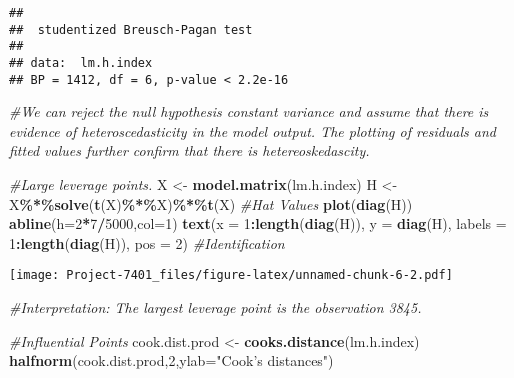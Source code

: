 \documentclass[
]{article}
\newenvironment{Shaded}{\begin{snugshade}}{\end{snugshade}}
\newcommand{\AttributeTok}[1]{\textcolor[rgb]{0.13,0.29,0.53}{#1}}
\newcommand{\CommentTok}[1]{\textcolor[rgb]{0.56,0.35,0.01}{\textit{#1}}}
\newcommand{\DecValTok}[1]{\textcolor[rgb]{0.00,0.00,0.81}{#1}}
\newcommand{\FunctionTok}[1]{\textcolor[rgb]{0.13,0.29,0.53}{\textbf{#1}}}
\newcommand{\NormalTok}[1]{#1}
\newcommand{\OtherTok}[1]{\textcolor[rgb]{0.56,0.35,0.01}{#1}}
\newcommand{\SpecialCharTok}[1]{\textcolor[rgb]{0.81,0.36,0.00}{\textbf{#1}}}
\newcommand{\StringTok}[1]{\textcolor[rgb]{0.31,0.60,0.02}{#1}}
\begin{document}
\begin{verbatim}
## 
##  studentized Breusch-Pagan test
## 
## data:  lm.h.index
## BP = 1412, df = 6, p-value < 2.2e-16
\end{verbatim}

\begin{Shaded}
\begin{Highlighting}[]
\CommentTok{\#We can reject the null hypothesis constant variance and assume that there is evidence of heteroscedasticity in the model output. The plotting of residuals and fitted values further confirm that there is hetereoskedascity. }

\CommentTok{\#Large leverage points.}
\NormalTok{X }\OtherTok{\textless{}{-}} \FunctionTok{model.matrix}\NormalTok{(lm.h.index)}
\NormalTok{H }\OtherTok{\textless{}{-}}\NormalTok{ X}\SpecialCharTok{\%*\%}\FunctionTok{solve}\NormalTok{(}\FunctionTok{t}\NormalTok{(X)}\SpecialCharTok{\%*\%}\NormalTok{X)}\SpecialCharTok{\%*\%}\FunctionTok{t}\NormalTok{(X) }\CommentTok{\#Hat Values}
\FunctionTok{plot}\NormalTok{(}\FunctionTok{diag}\NormalTok{(H))}
\FunctionTok{abline}\NormalTok{(}\AttributeTok{h=}\DecValTok{2}\SpecialCharTok{*}\DecValTok{7}\SpecialCharTok{/}\DecValTok{5000}\NormalTok{,}\AttributeTok{col=}\DecValTok{1}\NormalTok{)}
\FunctionTok{text}\NormalTok{(}\AttributeTok{x =} \DecValTok{1}\SpecialCharTok{:}\FunctionTok{length}\NormalTok{(}\FunctionTok{diag}\NormalTok{(H)), }\AttributeTok{y =} \FunctionTok{diag}\NormalTok{(H), }\AttributeTok{labels =} \DecValTok{1}\SpecialCharTok{:}\FunctionTok{length}\NormalTok{(}\FunctionTok{diag}\NormalTok{(H)), }\AttributeTok{pos =} \DecValTok{2}\NormalTok{) }\CommentTok{\#Identification}
\end{Highlighting}
\end{Shaded}

\texttt{[image: Project-7401\_files/figure-latex/unnamed-chunk-6-2.pdf]}

\begin{Shaded}
\begin{Highlighting}[]
\CommentTok{\#Interpretation: The largest leverage point is the observation 3845.}

\CommentTok{\#Influential Points}
\NormalTok{cook.dist.prod }\OtherTok{\textless{}{-}} \FunctionTok{cooks.distance}\NormalTok{(lm.h.index)}
\FunctionTok{halfnorm}\NormalTok{(cook.dist.prod,}\DecValTok{2}\NormalTok{,}\AttributeTok{ylab=}\StringTok{"Cook’s distances"}\NormalTok{)}
\end{Highlighting}
\end{Shaded}
\end{document}
